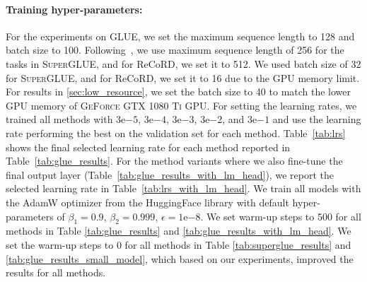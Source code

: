 \documentclass{article}
\newcommand{\glue}{\textsc{GLUE}\xspace}
\newcommand{\superglue}{\textsc{SuperGLUE}\xspace}
\begin{document}
\paragraph{Training hyper-parameters:} For the experiments on \glue, we set the maximum sequence length to 128 and batch size to 100. Following~\citet{raffel2019exploring}, we use maximum sequence length of 256 for the tasks in \superglue, and for ReCoRD, we set it to 512. We used batch size of 32 for \superglue, and for ReCoRD, we set it to 16 due to the GPU memory limit. For results in  \textsection\ref{sec:low_resource}, we set the batch size to 40 to match the lower GPU memory of \textsc{GeForce GTX 1080 Ti} GPU. For setting the learning rates, we trained all methods with $3\mathrm{e}{-5}$,  $3\mathrm{e}{-4}$,  $3\mathrm{e}{-3}$,  $3\mathrm{e}{-2}$, and  $3\mathrm{e}{-1}$ and use the learning rate performing the best on the validation set for each method. Table~\ref{tab:lrs} shows the final selected learning rate for each method reported in Table~\ref{tab:glue_results}. For the method variants where we also fine-tune the final output layer (Table~\ref{tab:glue_results_with_lm_head}), we report the selected learning rate in Table~\ref{tab:lrs_with_lm_head}. We train all models with the AdamW optimizer from the HuggingFace library \citep{wolf-etal2020transformers} with default hyper-parameters of $\beta_1=0.9$, $\beta_2=0.999$, $\epsilon=1\mathrm{e}{-8}$. We set warm-up steps to 500 for all methods in Table \ref{tab:glue_results} and \ref{tab:glue_results_with_lm_head}. We set the warm-up steps to 0 for all methods in Table \ref{tab:superglue_results} and \ref{tab:glue_results_small_model}, which based on our experiments, improved the results for all methods.
\end{document}
